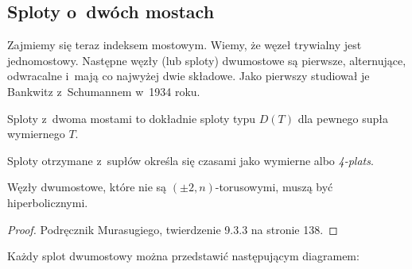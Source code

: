 \subsection{Sploty o~dwóch mostach} %
\label{sub:twobridge}


Zajmiemy się teraz indeksem mostowym.
Wiemy, że węzeł trywialny jest jednomostowy.
Następne węzły (lub sploty) dwumostowe są pierwsze, alternujące, odwracalne i~mają co najwyżej dwie składowe.
Jako pierwszy studiował je Bankwitz z~Schumannem w~1934 roku.

\begin{proposition}
\label{prp:two_bridge_tangle}
    Sploty z~dwoma mostami to dokładnie sploty typu $D(T)$ dla pewnego supła wymiernego $T$.
\end{proposition}

Sploty otrzymane z~supłów określa się czasami jako wymierne albo \emph{4-plats}.

\begin{proposition}
\label{prp:two_bridge_hyperbolic}
    Węzły dwumostowe, które nie są $(\pm 2, n)$-torusowymi, muszą być hiperbolicznymi.
\end{proposition}

\begin{proof}
    Podręcznik \cite{murasugi96} Murasugiego, twierdzenie 9.3.3 na stronie 138.
\end{proof}


Każdy splot dwumostowy można przedstawić następującym diagramem:



